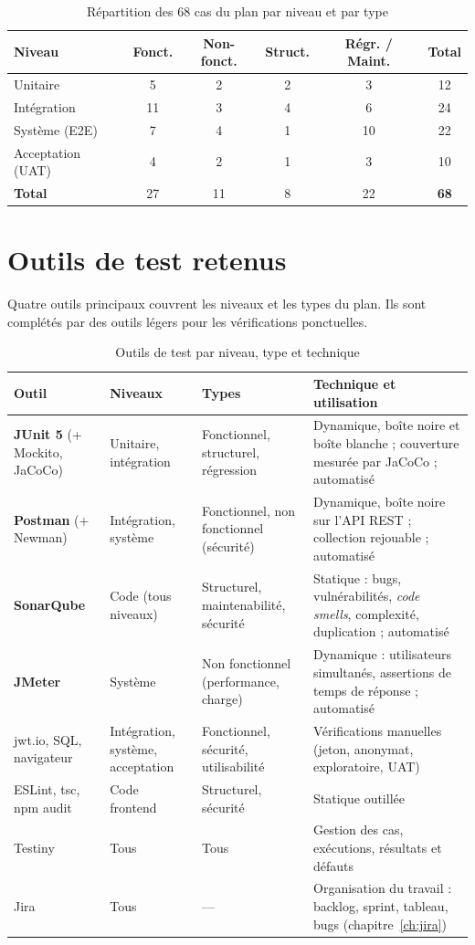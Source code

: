 \documentclass[12pt,a4paper]{report}
\begin{document}
\begin{table}[H]
\centering
\caption{Répartition des 68 cas du plan par niveau et par type}
\small
\begin{tabular}{@{}lccccc@{}}
\toprule
\rowcolor{evlight}\textbf{Niveau} & \textbf{Fonct.} & \textbf{Non-fonct.} & \textbf{Struct.} & \textbf{Régr. / Maint.} & \textbf{Total}\\
\midrule
Unitaire & 5 & 2 & 2 & 3 & 12\\
Intégration & 11 & 3 & 4 & 6 & 24\\
Système (E2E) & 7 & 4 & 1 & 10 & 22\\
Acceptation (UAT) & 4 & 2 & 1 & 3 & 10\\
\midrule
\textbf{Total} & 27 & 11 & 8 & 22 & \textbf{68}\\
\bottomrule
\end{tabular}
\end{table}

\section{Outils de test retenus}
Quatre outils principaux couvrent les niveaux et les types du plan. Ils sont complétés par des outils légers pour les vérifications ponctuelles.

\begin{table}[H]
\centering
\caption{Outils de test par niveau, type et technique}
\small
\begin{tabularx}{\textwidth}{@{}p{2.2cm}p{3cm}p{3.4cm}X@{}}
\toprule
\rowcolor{evlight}\textbf{Outil} & \textbf{Niveaux} & \textbf{Types} & \textbf{Technique et utilisation}\\
\midrule
\textbf{JUnit 5} (+ Mockito, JaCoCo) & Unitaire, intégration & Fonctionnel, structurel, régression & Dynamique, boîte noire et boîte blanche ; couverture mesurée par JaCoCo ; automatisé\\
\textbf{Postman} (+ Newman) & Intégration, système & Fonctionnel, non fonctionnel (sécurité) & Dynamique, boîte noire sur l'API REST ; collection rejouable ; automatisé\\
\textbf{SonarQube} & Code (tous niveaux) & Structurel, maintenabilité, sécurité & Statique : bugs, vulnérabilités, \textit{code smells}, complexité, duplication ; automatisé\\
\textbf{JMeter} & Système & Non fonctionnel (performance, charge) & Dynamique : utilisateurs simultanés, assertions de temps de réponse ; automatisé\\
\midrule
jwt.io, SQL, navigateur & Intégration, système, acceptation & Fonctionnel, sécurité, utilisabilité & Vérifications manuelles (jeton, anonymat, exploratoire, UAT)\\
ESLint, tsc, npm audit & Code frontend & Structurel, sécurité & Statique outillée\\
Testiny & Tous & Tous & Gestion des cas, exécutions, résultats et défauts\\
Jira & Tous & --- & Organisation du travail : backlog, sprint, tableau, bugs (chapitre~\ref{ch:jira})\\
\bottomrule
\end{tabularx}
\end{table}
\end{document}
